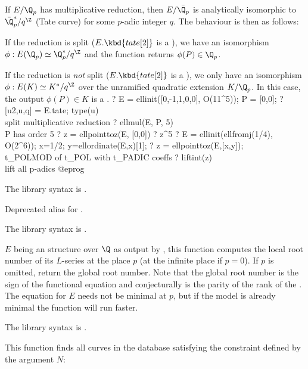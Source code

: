 If $E/\Q_p$ has multiplicative reduction, then $E/\bar{\Q_p}$ is analytically
isomorphic to $\bar{\Q}_p^*/q^\Z$ (Tate curve) for some $p$-adic integer $q$.
The behaviour is then as follows:

\item If the reduction is split ($E.\kbd{tate[2]}$ is a ), we have
an isomorphism $\phi: E(\Q_p) \simeq \Q_p^*/q^\Z$ and the function returns
$\phi(P)\in \Q_p$.

\item If the reduction is \emph{not} split ($E.\kbd{tate[2]}$ is a
), we only have an isomorphism $\phi: E(K) \simeq K^*/q^\Z$ over
the unramified quadratic extension $K/\Q_p$. In this case, the output
$\phi(P)\in K$ is a .
\bprog
? E = ellinit([0,-1,1,0,0], O(11^5)); P = [0,0];
? [u2,u,q] = E.tate; type(u) \\ split multiplicative reduction
? ellmul(E, P, 5)  \\ P has order 5
? z = ellpointtoz(E, [0,0])
? z^5
? E = ellinit(ellfromj(1/4), O(2^6)); x=1/2; y=ellordinate(E,x)[1];
? z = ellpointtoz(E,[x,y]); \\ t_POLMOD of t_POL with t_PADIC coeffs
? liftint(z) \\ lift all p-adics
@eprog

The library syntax is .

\label{se:ellpow}
Deprecated alias for .

The library syntax is .

\label{se:ellrootno}
$E$ being an  structure over $\Q$ as output by ,
this function computes the local root number of its $L$-series at the place
$p$ (at the infinite place if $p = 0$). If $p$ is omitted, return the global
root number. Note that the global root number is the sign of the functional
equation and conjecturally is the parity of the rank of the . The equation for $E$ needs not be minimal at $p$, but if the model
is already minimal the function will run faster.

The library syntax is .

\label{se:ellsearch}
This function finds all curves in the  database satisfying
the constraint defined by the argument $N$:

